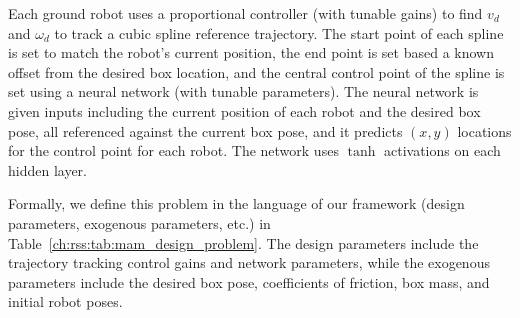 Each ground robot uses a proportional controller (with tunable gains) to find $v_d$ and $\omega_d$ to track a cubic spline reference trajectory. The start point of each spline is set to match the robot's current position, the end point is set based a known offset from the desired box location, and the central control point of the spline is set using a neural network (with tunable parameters). The neural network is given inputs including the current position of each robot and the desired box pose, all referenced against the current box pose, and it predicts $(x, y)$ locations for the control point for each robot. The network uses $\tanh$ activations on each hidden layer.

Formally, we define this problem in the language of our framework (design parameters, exogenous parameters, etc.) in Table~\ref{ch:rss:tab:mam_design_problem}. The design parameters include the trajectory tracking control gains and network parameters, while the exogenous parameters include the desired box pose, coefficients of friction, box mass, and initial robot poses.

